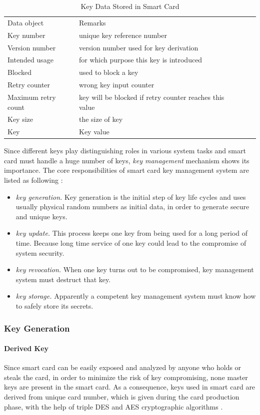 \begin{table}[!htb]
\caption{Key Data Stored in Smart Card\cite{handbook}}
\begin{tabular}{lllll}
\hline\hline
Data object & Remarks\\[0.5ex]
Key number & unique key reference number\\
Version number & version number used for key derivation\\
Intended usage & for which purpose this key is introduced\\
Blocked & used to block a key\\
Retry counter & wrong key input counter\\
Maximum retry count & key will be blocked if retry counter reaches this value\\
Key size & the size of key\\
Key & Key value\\
\hline
\end{tabular}
\label{table:smart-card-key}
\end{table}

Since different keys play distinguishing roles in various system tasks and smart card must handle a huge number of keys, \emph{key management} mechanism shows its importance. The core responsibilities of smart card key management system are listed as following \cite{handbook}:
\begin{itemize}
\item \emph{key generation.} Key generation is the initial step of key life cycles and uses usually physical random numbers as initial data, in order to generate secure and unique keys. 
\item \emph{key update.} This process keeps one key from being used for a long period of time. Because long time service of one key could lead to the compromise of system security.
\item \emph{key revocation.} When one key turns out to be compromised, key management system must destruct that key.
\item \emph{key storage.} Apparently a competent key management system must know how to safely store its secrets.
\end{itemize}
\subsubsection{Key Generation}
\paragraph{Derived Key}
Since smart card can be easily exposed and analyzed by anyone who holds or steals the card, in order to minimize the risk of key compromising, none master keys are present in the smart card. As a consequence, keys used in smart card are derived from unique card number, which is given during the card production phase, with the help of triple DES and AES cryptographic algorithms \cite{handbook}.

